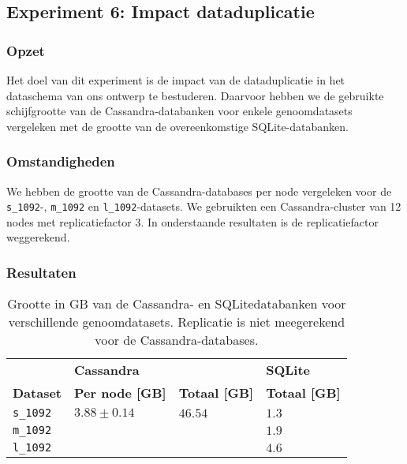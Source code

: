 \subsection{Experiment 6: Impact dataduplicatie}
\label{exp6}

\subsubsection{Opzet}
Het doel van dit experiment is de impact van de dataduplicatie in het dataschema van ons ontwerp te bestuderen. Daarvoor hebben we de gebruikte schijfgrootte van de Cassandra-databanken voor enkele genoomdatasets vergeleken met de grootte van de overeenkomstige SQLite-databanken.

\subsubsection{Omstandigheden}

We hebben de grootte van de Cassandra-databases per node vergeleken voor de \texttt{s\_1092}-,  \texttt{m\_1092} en \texttt{l\_1092}-datasets. We gebruikten een Cassandra-cluster van 12 nodes met replicatiefactor 3. In onderstaande resultaten is de replicatiefactor weggerekend.

\newpage
\subsubsection{Resultaten}

\begin{table}[h]
\centering
\begin{tabular}{@{}llll@{}}
\cmidrule(l){2-4}
                & \multicolumn{2}{|l|}{\textbf{Cassandra}}                                                      & \multicolumn{1}{l|}{\textbf{SQLite}}                             \\ 
\cmidrule(l){1-4}
\multicolumn{1}{|l|}{\textbf{Dataset}}  & \multicolumn{1}{l|}{\textbf{Per node [GB]}}               & \multicolumn{1}{l|}{\textbf{Totaal [GB]}} & \multicolumn{1}{l|}{\textbf{Totaal [GB]}} \\ \midrule
\multicolumn{1}{|l|}{\texttt{s\_1092}} & \multicolumn{1}{l|}{$3.88 \pm 0.14$}             & \multicolumn{1}{l|}{$46.54$}          & \multicolumn{1}{l|}{$1.3$}                          \\
\multicolumn{1}{|l|}{\texttt{m\_1092}} & \multicolumn{1}{l|}{$ $}             & \multicolumn{1}{l|}{$ $}          & \multicolumn{1}{l|}{$1.9$}                          \\
\multicolumn{1}{|l|}{\texttt{l\_1092}} & \multicolumn{1}{l|}{$ $}             & \multicolumn{1}{l|}{$ $}          & \multicolumn{1}{l|}{$4.6$}                          \\
\bottomrule
\end{tabular}
\caption{Grootte in GB van de Cassandra- en SQLitedatabanken voor verschillende genoomdatasets. Replicatie is niet meegerekend voor de Cassandra-databases.}
\end{table}

